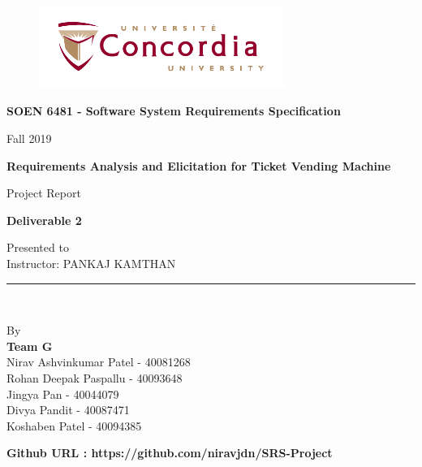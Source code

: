 \documentclass[11pt, english]{report}
\begin{document}
\begin{titlepage}

\begin{center}
\vspace*{-1in}
\begin{figure}[htb]
\begin{center}
\includegraphics[width=8cm]{images/logo.png}
\end{center}
\end{figure}
\begin{Large}
\textbf{SOEN 6481 - Software System Requirements Specification} \\
\end{Large}
\vspace*{0.1in}
Fall 2019\\
\vspace*{0.5in}
\begin{Large}
\textbf{Requirements Analysis and Elicitation for Ticket Vending Machine} \\
\end{Large}
\vspace*{0.4in}
\begin{large}
Project Report\\
\end{large}
\vspace*{0.2in}
\begin{Large}
\textbf{Deliverable 2} \\
\end{Large}
\vspace*{0.3in}
\begin{large}
Presented to \\
\vspace*{0.1in}
Instructor: PANKAJ KAMTHAN 
 \\
\end{large}
\vspace*{0.3in}
\rule{80mm}{0.1mm}\\
\vspace*{0.1in}
\begin{large}
By \\
\textbf{Team G}\\
Nirav Ashvinkumar Patel - 40081268\\
Rohan Deepak Paspallu - 40093648\\
Jingya Pan - 40044079\\
Divya Pandit - 40087471 \\
Koshaben Patel - 40094385 \\


\end{large}
\vspace*{0.3in}
\textbf{Github URL : https://github.com/niravjdn/SRS-Project}
\end{center}
\end{titlepage}
\end{document}
